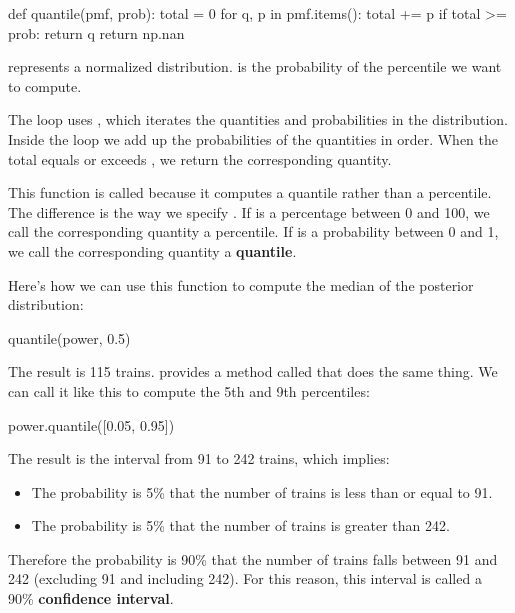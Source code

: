 \documentclass[12pt]{book}
\theoremstyle{exercise}
\begin{document}
\begin{code}
def quantile(pmf, prob):
    total = 0
    for q, p in pmf.items():
        total += p
        if total >= prob:
            return q
    return np.nan
\end{code}

 represents a normalized distribution.
 is the probability of the percentile we want to compute.

The loop uses , which iterates the quantities and probabilities in the distribution.
Inside the loop we add up the probabilities of the quantities in order.
When the total equals or exceeds , we return the corresponding quantity.

This function is called  because it computes a quantile rather than a percentile.
The difference is the way we specify .
If  is a percentage between 0 and 100, we call the corresponding quantity a percentile.
If  is a probability between 0 and 1, we call the corresponding quantity a {\bf quantile}.

Here's how we can use this function to compute the median of the posterior distribution:

\begin{code}
quantile(power, 0.5)
\end{code}

The result is 115 trains.
 provides a method called  that does the same thing.
We can call it like this to compute the 5th and 9th percentiles:

\begin{code}
power.quantile([0.05, 0.95])
\end{code}

The result is the interval from 91 to 242 trains, which implies:

\begin{itemize}

\item The probability is 5\% that the number of trains is less than or equal to 91.

\item The probability is 5\% that the number of trains is greater than 242.

\end{itemize}

Therefore the probability is 90\% that the number of trains falls between 91 and 242 (excluding 91 and including 242).
For this reason, this interval is called a 90\% {\bf confidence interval}.
\end{document}
